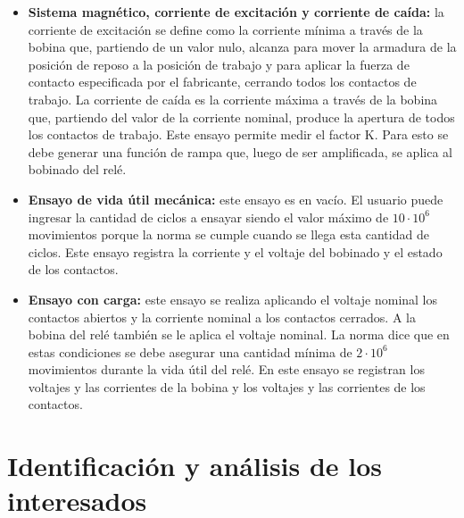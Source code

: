 \documentclass[11pt]{charter}
\begin{document}
\begin{itemize}
\item \textbf{Sistema magnético, corriente de excitación y corriente de caída:} la corriente de excitación se define como la corriente mínima a través de la bobina que, partiendo de un valor nulo, alcanza para mover la armadura de la posición de reposo a la posición de trabajo y para aplicar la fuerza de contacto especificada por el fabricante, cerrando todos los contactos de trabajo. La corriente de caída es la corriente máxima a través de la bobina que, partiendo del valor de la corriente nominal, produce la apertura de todos los contactos de trabajo. Este ensayo permite medir el factor K. Para esto se debe generar una función de rampa que, luego de ser amplificada, se aplica al bobinado del relé.
\item \textbf{Ensayo de vida útil mecánica:} este ensayo es en vacío. El usuario puede ingresar la cantidad de ciclos a ensayar siendo el valor máximo de $10 \cdot 10^6$ movimientos porque la norma se cumple cuando se llega esta cantidad de ciclos. Este ensayo registra la corriente y el voltaje del bobinado y el estado de los contactos.
\item \textbf{Ensayo con carga:} este ensayo se realiza aplicando el voltaje nominal los contactos abiertos y la corriente nominal a los contactos cerrados. A la bobina del relé también se le aplica el voltaje nominal. La norma dice que en estas condiciones se debe asegurar una cantidad mínima de $2 \cdot 10^6$ movimientos durante la vida útil del relé. En este ensayo se registran los voltajes y las corrientes de la bobina y los voltajes y las corrientes de los contactos.
\end{itemize}

\section{Identificación y análisis de los interesados}
\label{sec:interesados}
\end{document}
